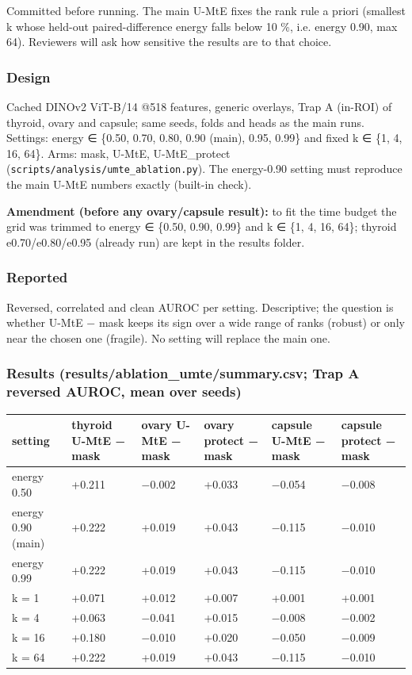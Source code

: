 {\small
Committed before running. The main U-MtE fixes the rank rule a priori (smallest k whose held-out paired-difference
energy falls below 10 \%, i.e. energy 0.90, max 64). Reviewers will ask how sensitive the results are to that choice.

\subsubsection{Design}\label{design}

Cached DINOv2 ViT-B/14 @518 features, generic overlays, Trap A (in-ROI) of thyroid, ovary and capsule; same seeds,
folds and heads as the main runs. Settings: energy ∈ \{0.50, 0.70, 0.80, 0.90 (main), 0.95, 0.99\} and fixed
k ∈ \{1, 4, 16, 64\}. Arms: mask, U-MtE, U-MtE\_protect (\texttt{scripts/analysis/umte\_ablation.py}). The energy-0.90 setting
must reproduce the main U-MtE numbers exactly (built-in check).

\textbf{Amendment (before any ovary/capsule result):} to fit the time budget the grid was trimmed to energy ∈ \{0.50,
0.90, 0.99\} and k ∈ \{1, 4, 16, 64\}; thyroid e0.70/e0.80/e0.95 (already run) are kept in the results folder.

\subsubsection{Reported}\label{reported}

Reversed, correlated and clean AUROC per setting. Descriptive; the question is whether U-MtE − mask keeps its sign
over a wide range of ranks (robust) or only near the chosen one (fragile). No setting will replace the main one.

\subsubsection{Results (results/ablation\_umte/summary.csv; Trap A reversed AUROC, mean over seeds)}\label{results-resultsablation_umtesummarycsv-trap-a-reversed-auroc-mean-over-seeds}

{ %
\begin{longtable}[]{@{}llllll@{}}
\toprule\noalign{}
setting & thyroid U-MtE − mask & ovary U-MtE − mask & ovary protect − mask & capsule U-MtE − mask & capsule protect − mask \\
\midrule\noalign{}
\endhead
\bottomrule\noalign{}
\endlastfoot
energy 0.50 & +0.211 & −0.002 & +0.033 & −0.054 & −0.008 \\
energy 0.90 (main) & +0.222 & +0.019 & +0.043 & −0.115 & −0.010 \\
energy 0.99 & +0.222 & +0.019 & +0.043 & −0.115 & −0.010 \\
k = 1 & +0.071 & +0.012 & +0.007 & +0.001 & +0.001 \\
k = 4 & +0.063 & −0.041 & +0.015 & −0.008 & −0.002 \\
k = 16 & +0.180 & −0.010 & +0.020 & −0.050 & −0.009 \\
k = 64 & +0.222 & +0.019 & +0.043 & −0.115 & −0.010 \\
\end{longtable}
}

}
